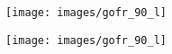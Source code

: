 \documentclass[thesis]{subfiles}
\begin{document}
\begin{minipage}{0.5\textwidth}
	\texttt{[image: images/gofr\_90\_l]}
\end{minipage}
\hfill
\begin{minipage}{0.5\textwidth}\raggedleft
	\texttt{[image: images/gofr\_90\_l]}
\end{minipage}
\end{document}

